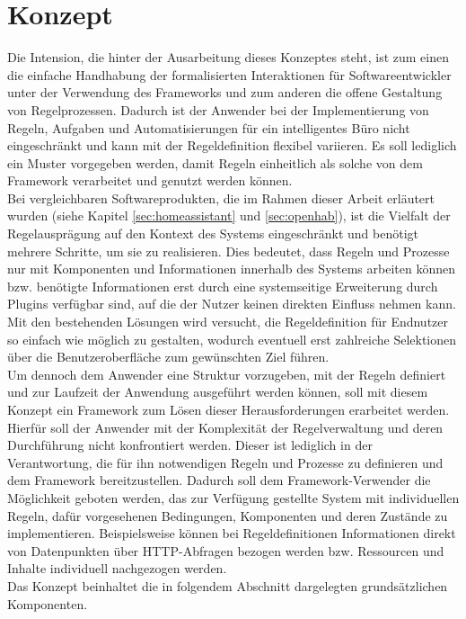 \section{Konzept}
\label{sec:concept}
    Die Intension, die hinter der Ausarbeitung dieses Konzeptes steht, ist zum einen die einfache Handhabung der 
    formalisierten Interaktionen für Softwareentwickler %
    unter der Verwendung des Frameworks und zum anderen die 
    offene Gestaltung von Regelprozessen. Dadurch ist der Anwender bei der Implementierung von Regeln, Aufgaben und Automatisierungen 
    für ein intelligentes Büro nicht eingeschränkt und kann mit der Regeldefinition flexibel variieren.
    Es soll lediglich ein Muster vorgegeben werden, damit Regeln einheitlich als solche von dem Framework 
    verarbeitet und genutzt werden können. 
    \\ 
    \linebreak
    Bei vergleichbaren Softwareprodukten, die im Rahmen dieser Arbeit erläutert 
    wurden (siehe Kapitel \ref{sec:homeassistant} und \ref{sec:openhab}), ist die Vielfalt der Regelausprägung auf 
    den Kontext des Systems eingeschränkt und benötigt mehrere Schritte, um sie zu realisieren. Dies bedeutet, dass 
    Regeln und Prozesse nur mit Komponenten und Informationen innerhalb des Systems arbeiten können bzw. benötigte 
    Informationen erst durch eine systemseitige Erweiterung durch Plugins verfügbar sind, auf die der Nutzer keinen direkten 
    Einfluss nehmen kann. Mit den bestehenden Lösungen wird versucht, die Regeldefinition für Endnutzer so 
    einfach wie möglich zu gestalten, wodurch eventuell erst zahlreiche Selektionen über die Benutzeroberfläche zum gewünschten Ziel führen.   
    \\
    \linebreak
    Um dennoch dem Anwender eine Struktur vorzugeben, mit der Regeln definiert und zur Laufzeit der Anwendung ausgeführt 
    werden können, soll mit diesem Konzept ein Framework zum Lösen dieser Herausforderungen erarbeitet werden. Hierfür soll 
    der Anwender mit der Komplexität der Regelverwaltung und deren Durchführung nicht konfrontiert werden. Dieser ist lediglich 
    in der Verantwortung, die für ihn notwendigen Regeln und Prozesse zu definieren und dem Framework bereitzustellen. 
    Dadurch soll dem Framework-Verwender die Möglichkeit geboten werden, das zur Verfügung gestellte System 
    mit individuellen Regeln, dafür vorgesehenen Bedingungen, Komponenten und deren Zustände zu implementieren. Beispielsweise 
    können bei Regeldefinitionen Informationen direkt von Datenpunkten über \acs{HTTP}-Abfragen bezogen werden bzw. Ressourcen 
    und Inhalte individuell nachgezogen werden.
    \\ 
    Das Konzept beinhaltet die in folgendem Abschnitt dargelegten grundsätzlichen Komponenten. %

